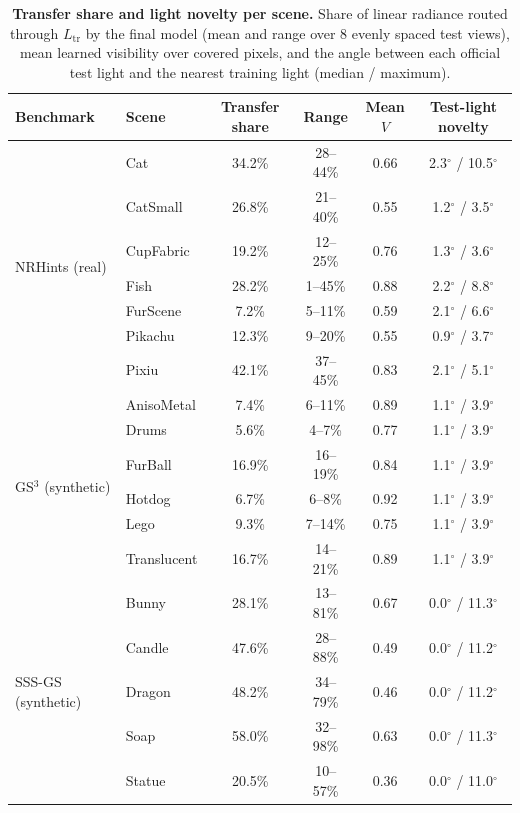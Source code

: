 \begin{table}[t]
\caption{\textbf{Transfer share and light novelty per scene.} Share of linear radiance routed through $L_{\mathrm{tr}}$ by the final model (mean and range over 8 evenly spaced test views), mean learned visibility over covered pixels, and the angle between each official test light and the nearest training light (median / maximum).}
\label{tab:supp_shares}
\centering\scriptsize
\setlength{\tabcolsep}{3pt}
\begin{tabular}{@{}llcccc@{}}
\toprule
Benchmark & Scene & Transfer share & Range & Mean $V$ & Test-light novelty \\
\midrule
\multirow{7}{*}{NRHints (real)} & Cat & 34.2\% & 28--44\% & 0.66 & 2.3$^\circ$ / 10.5$^\circ$ \\
 & CatSmall & 26.8\% & 21--40\% & 0.55 & 1.2$^\circ$ / 3.5$^\circ$ \\
 & CupFabric & 19.2\% & 12--25\% & 0.76 & 1.3$^\circ$ / 3.6$^\circ$ \\
 & Fish & 28.2\% & 1--45\% & 0.88 & 2.2$^\circ$ / 8.8$^\circ$ \\
 & FurScene & 7.2\% & 5--11\% & 0.59 & 2.1$^\circ$ / 6.6$^\circ$ \\
 & Pikachu & 12.3\% & 9--20\% & 0.55 & 0.9$^\circ$ / 3.7$^\circ$ \\
 & Pixiu & 42.1\% & 37--45\% & 0.83 & 2.1$^\circ$ / 5.1$^\circ$ \\
\midrule
\multirow{6}{*}{GS$^3$ (synthetic)} & AnisoMetal & 7.4\% & 6--11\% & 0.89 & 1.1$^\circ$ / 3.9$^\circ$ \\
 & Drums & 5.6\% & 4--7\% & 0.77 & 1.1$^\circ$ / 3.9$^\circ$ \\
 & FurBall & 16.9\% & 16--19\% & 0.84 & 1.1$^\circ$ / 3.9$^\circ$ \\
 & Hotdog & 6.7\% & 6--8\% & 0.92 & 1.1$^\circ$ / 3.9$^\circ$ \\
 & Lego & 9.3\% & 7--14\% & 0.75 & 1.1$^\circ$ / 3.9$^\circ$ \\
 & Translucent & 16.7\% & 14--21\% & 0.89 & 1.1$^\circ$ / 3.9$^\circ$ \\
\midrule
\multirow{5}{*}{SSS-GS (synthetic)} & Bunny & 28.1\% & 13--81\% & 0.67 & 0.0$^\circ$ / 11.3$^\circ$ \\
 & Candle & 47.6\% & 28--88\% & 0.49 & 0.0$^\circ$ / 11.2$^\circ$ \\
 & Dragon & 48.2\% & 34--79\% & 0.46 & 0.0$^\circ$ / 11.2$^\circ$ \\
 & Soap & 58.0\% & 32--98\% & 0.63 & 0.0$^\circ$ / 11.3$^\circ$ \\
 & Statue & 20.5\% & 10--57\% & 0.36 & 0.0$^\circ$ / 11.0$^\circ$ \\
\bottomrule
\end{tabular}
\end{table}
